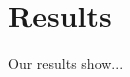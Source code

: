 \documentclass[journal, a4paper]{}
\begin{document}
\section{Results}

Our results show...
%
%
%
%
\end{document}

